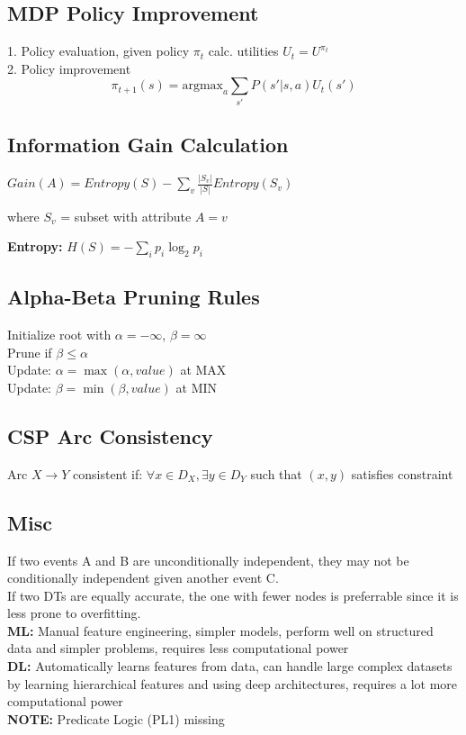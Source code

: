 \documentclass[8pt,landscape,a4paper]{article}
\begin{document}
\begin{multicols*}{3}
\subsection{MDP Policy Improvement}
1. Policy evaluation, given policy $\pi_t$ calc. utilities $U_t=U^{\pi_t}$\\
2. Policy improvement $$\pi_{t+1}(s)=\textrm{argmax}_a\sum_{s'}P(s'|s,a)U_t(s')$$

\subsection{Information Gain Calculation}
$Gain(A) = Entropy(S) - \sum_{v} \frac{|S_v|}{|S|} Entropy(S_v)$

where $S_v$ = subset with attribute $A = v$

\textbf{Entropy:} $H(S) = -\sum_i p_i \log_2 p_i$

\subsection{Alpha-Beta Pruning Rules}
Initialize root with $\alpha=-\infty $, $\beta=\infty$\\
Prune if $\beta \leq \alpha$ \\
Update: $\alpha = \max(\alpha, value)$ at MAX\\
Update: $\beta = \min(\beta, value)$ at MIN

\subsection{CSP Arc Consistency}
Arc $X \rightarrow Y$ consistent if:
$\forall x \in D_X, \exists y \in D_Y$ such that $(x,y)$ satisfies constraint

\subsection{Misc}
If two events A and B are unconditionally independent, they may not be conditionally independent given another event C.\\

If two DTs are equally accurate, the one with fewer nodes is preferrable since it is less prone to overfitting.\\

\textbf{ML:} Manual feature engineering, simpler models, perform well on structured data and simpler problems, requires less computational power\\

\textbf{DL:} Automatically learns features from data, can handle large complex datasets by learning hierarchical features and using deep architectures, requires a lot more computational power\\

\textbf{NOTE:} Predicate Logic (PL1) missing
\end{multicols*}
\end{document}

